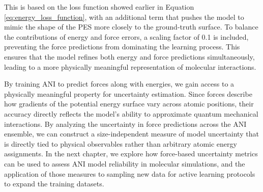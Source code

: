 This is based on the loss function showed earlier in Equation \ref{eq:energy_loss_function}, with an additional term that pushes the model to mimic the shape of the PES more closely to the ground-truth surface.
To balance the contributions of energy and force errors, a scaling factor of 0.1 is included, preventing the force predictions from dominating the learning process. 
This ensures that the model refines both energy and force predictions simultaneously, leading to a more physically meaningful representation of molecular interactions.

By training ANI to predict forces along with energies, we gain access to a physically meaningful property for uncertainty estimation. 
Since forces describe how gradients of the potential energy surface vary across atomic positions, their accuracy directly reflects the model's ability to approximate quantum mechanical interactions.
By analyzing the uncertainty in force predictions across the ANI ensemble, we can construct a size-independent measure of model uncertainty that is directly tied to physical observables rather than arbitrary atomic energy assignments.
In the next chapter, we explore how force-based uncertainty metrics can be used to assess ANI model reliability in molecular simulations, and the application of those measures to sampling new data for active learning protocols to expand the training datasets.